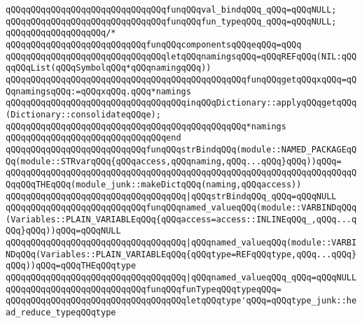 \verb|qQQqqQQqqQQqqQQqqQQqqQQqqQQqqQQqfunqQQqval_bindqQQq_qQQq=qQQqNULL;|\newline
\verb|qQQqqQQqqQQqqQQqqQQqqQQqqQQqqQQqfunqQQqfun_typeqQQq_qQQq=qQQqNULL;|\newline
\newline
\verb|qQQqqQQqqQQqqQQqqQQq/*|\newline
\verb|qQQqqQQqqQQqqQQqqQQqqQQqqQQqfunqQQqcomponentsqQQqeqQQq=qQQq|\newline
\verb|qQQqqQQqqQQqqQQqqQQqqQQqqQQqqQQqletqQQqnamingsqQQq=qQQqREFqQQq(NIL:qQQqqQQqList(qQQqSymbolqQQq*qQQqnamingqQQq))|\newline
\verb|qQQqqQQqqQQqqQQqqQQqqQQqqQQqqQQqqQQqqQQqqQQqqQQqfunqQQqgetqQQqxqQQq=qQQqnamingsqQQq:=qQQqxqQQq.qQQq*namings|\newline
\verb|qQQqqQQqqQQqqQQqqQQqqQQqqQQqqQQqqQQqinqQQqDictionary::applyqQQqgetqQQq(Dictionary::consolidateqQQqe);|\newline
\verb|qQQqqQQqqQQqqQQqqQQqqQQqqQQqqQQqqQQqqQQqqQQqqQQq*namings|\newline
\verb|qQQqqQQqqQQqqQQqqQQqqQQqqQQqqQQqend|\newline
\newline
\verb|qQQqqQQqqQQqqQQqqQQqqQQqqQQqfunqQQqstrBindqQQq(module::NAMED_PACKAGEqQQq(module::STRvarqQQq{qQQqaccess,qQQqnaming,qQQq...qQQq}qQQq))qQQq=|\newline
\verb|qQQqqQQqqQQqqQQqqQQqqQQqqQQqqQQqqQQqqQQqqQQqqQQqqQQqqQQqqQQqqQQqqQQqqQQqqQQqTHEqQQq(module_junk::makeDictqQQq(naming,qQQqaccess))|\newline
\verb|qQQqqQQqqQQqqQQqqQQqqQQqqQQqqQQqqQQq|\verb#|qQQqstrBindqQQq_qQQq=qQQqNULL#\newline
\newline
\verb|qQQqqQQqqQQqqQQqqQQqqQQqqQQqfunqQQqnamed_valueqQQq(module::VARBINDqQQq(Variables::PLAIN_VARIABLEqQQq{qQQqaccess=access::INLINEqQQq_,qQQq...qQQq}qQQq))qQQq=qQQqNULL|\newline
\verb|qQQqqQQqqQQqqQQqqQQqqQQqqQQqqQQqqQQq|\verb#|qQQqnamed_valueqQQq(module::VARBINDqQQq(Variables::PLAIN_VARIABLEqQQq{qQQqtype=REFqQQqtype,qQQq...qQQq}qQQq))qQQq=qQQqTHEqQQqtype#\newline
\verb|qQQqqQQqqQQqqQQqqQQqqQQqqQQqqQQqqQQq|\verb#|qQQqnamed_valueqQQq_qQQq=qQQqNULL#\newline
\newline
\verb|qQQqqQQqqQQqqQQqqQQqqQQqqQQqfunqQQqfunTypeqQQqtypeqQQq=|\newline
\verb|qQQqqQQqqQQqqQQqqQQqqQQqqQQqqQQqqQQqletqQQqtype'qQQq=qQQqtype_junk::head_reduce_typeqQQqtype|\newline
